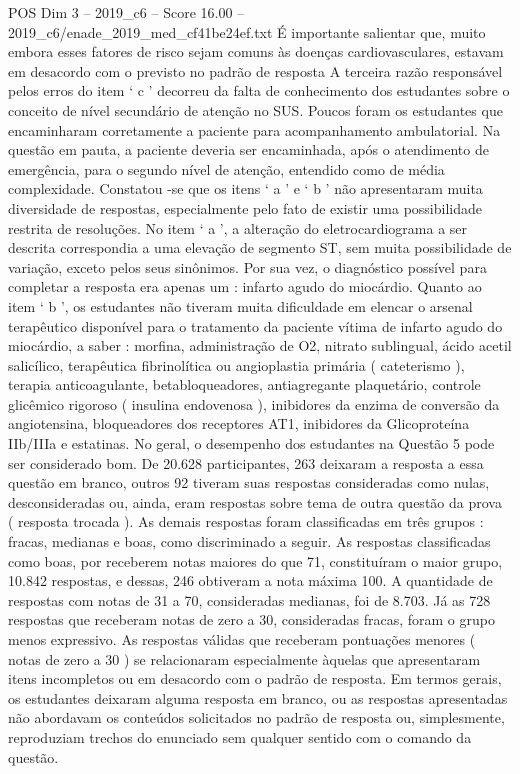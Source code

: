 \begin{textsample}{POS Dim 3 – 2019\_c6 – Score 16.00 – 2019\_c6/enade\_2019\_med\_cf41be24ef.txt}
É importante salientar que, muito embora esses fatores de risco sejam comuns às doenças cardiovasculares, estavam em desacordo com o previsto no padrão de resposta A terceira razão responsável pelos erros do item ‘ c ’ decorreu da falta de conhecimento dos estudantes sobre o conceito de nível secundário de atenção no SUS.
Poucos foram os estudantes que encaminharam corretamente a paciente para acompanhamento ambulatorial.
Na questão em pauta, a paciente deveria ser encaminhada, após o atendimento de emergência, para o segundo nível de atenção, entendido como de média complexidade.
Constatou -se que os itens ‘ a ’ e ‘ b ’ não apresentaram muita diversidade de respostas, especialmente pelo fato de existir uma possibilidade restrita de resoluções.
No item ‘ a ’, a alteração do eletrocardiograma a ser descrita correspondia a uma elevação de segmento ST, sem muita possibilidade de variação, exceto pelos seus sinônimos.
Por sua vez, o diagnóstico possível para completar a resposta era apenas um : infarto agudo do miocárdio.
Quanto ao item ‘ b ’, os estudantes não tiveram muita dificuldade em elencar o arsenal terapêutico disponível para o tratamento da paciente vítima de infarto agudo do miocárdio, a saber : morfina, administração de O2, nitrato sublingual, ácido acetil salicílico, terapêutica fibrinolítica ou angioplastia primária ( cateterismo ), terapia anticoagulante, betabloqueadores, antiagregante plaquetário, controle glicêmico rigoroso ( insulina endovenosa ), inibidores da enzima de conversão da angiotensina, bloqueadores dos receptores AT1, inibidores da Glicoproteína IIb/IIIa e estatinas.
No geral, o desempenho dos estudantes na Questão 5 pode ser considerado bom.
De 20.628 participantes, 263 deixaram a resposta a essa questão em branco, outros 92 tiveram suas respostas consideradas como nulas, desconsideradas ou, ainda, eram respostas sobre tema de outra questão da prova ( resposta trocada ).
As demais respostas foram classificadas em três grupos : fracas, medianas e boas, como discriminado a seguir.
As respostas classificadas como boas, por receberem notas maiores do que 71, constituíram o maior grupo, 10.842 respostas, e dessas, 246 obtiveram a nota máxima 100.
A quantidade de respostas com notas de 31 a 70, consideradas medianas, foi de 8.703.
Já as 728 respostas que receberam notas de zero a 30, consideradas fracas, foram o grupo menos expressivo.
As respostas válidas que receberam pontuações menores ( notas de zero a 30 ) se relacionaram especialmente àquelas que apresentaram itens incompletos ou em desacordo com o padrão de resposta.
Em termos gerais, os estudantes deixaram alguma resposta em branco, ou as respostas apresentadas não abordavam os conteúdos solicitados no padrão de resposta ou, simplesmente, reproduziam trechos do enunciado sem qualquer sentido com o comando da questão.

\end{textsample}
